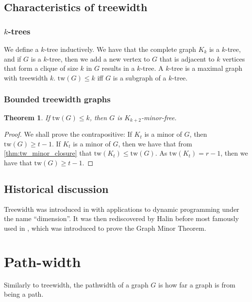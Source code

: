 \documentclass[]{report}
\newcommand{\tw}{\text{tw}}
\newtheorem{theorem}{Theorem}
\theoremstyle{definition}
\numberwithin{theorem}{section}
\numberwithin{equation}{section}
\begin{document}
\subsection{Characteristics of treewidth}\label{ssec:characterising_Treewidth}
\subsubsection{$k$-trees}\label{sssec:k-trees}
We define a $k$-tree inductively. We have that the complete graph $K_k$ is a $k$-tree, and if $G$ is a $k$-tree, then we add a new vertex to $G$ that is adjacent to $k$ vertices that form a clique of size $k$ in $G$ results in a $k$-tree. 
A $k$-tree is a maximal graph with treewidth $k$. $\tw(G) \leq k$ iff $G$ is a subgraph of a $k$-tree. 


\subsubsection{Bounded treewidth graphs}\label{sssec:Graph_treewidth_Bounded}
\begin{theorem}\label{thm:treewidth_clique-minor-free}
	If $\tw(G) \leq k$, then $G$ is $K_{k+2}$-minor-free. 
\end{theorem}
\begin{proof}
	We shall prove the contrapositive: If $K_t$ is a minor of $G$, then $\tw(G) \geq t-1$.
	If $K_t$ is a minor of $G$, then we have that from \cref{thm:tw_minor_closure} that $\tw(K_t) \leq \tw(G)$. As $\tw(K_t) = r-1$, then we have that $\tw(G) \geq t - 1$. 
\end{proof}

\subsection{Historical discussion}\label{ssec:tw_historical}
Treewidth was introduced in \cite{berteleChapterEliminationVariables1972} with applications to dynamic programming under the name ``dimension''. It was then rediscovered by Halin \cite{halinSfunctionsGraphs1976} before most famously used in \cite{robertsonGraphMinorsIII1984}, which was introduced to prove the Graph Minor Theorem\cite{robertsonGraphMinorsXX2004}.


\section{Path-width}\label{sec:Pathwidth}
Similarly to treewidth, the pathwidth of a graph $G$ is how far a graph is from being a path. 
\end{document}
